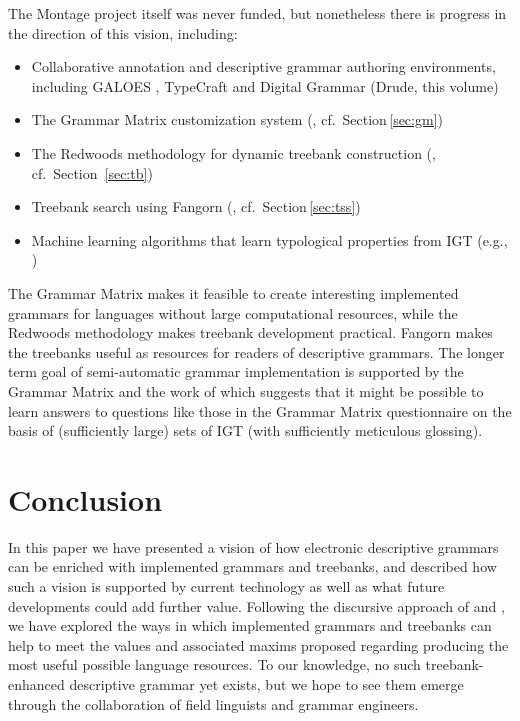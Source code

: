 \documentclass[12pt]{article}
\newcommand{\sref}[1]{Section$\,$\ref{#1}}
\begin{document}
The Montage project itself was never funded, but nonetheless there is progress
in the direction of this vision, including:

\begin{itemize}
\item Collaborative annotation and descriptive grammar authoring environments,
including GALOES \cite{Nordhoff:07}, TypeCraft \cite{Bee:Mih:09} and Digital Grammar \nocite{Drude:11} (Drude, this volume)
\item The Grammar Matrix customization system (, cf.\ \sref{sec:gm})
\item The Redwoods methodology for dynamic treebank construction (, cf.\ Section~\ref{sec:tb})
\item Treebank search using Fangorn (, cf.\ \sref{sec:tss})
\item Machine learning algorithms that learn typological properties
from IGT (e.g., )
\end{itemize}

The Grammar Matrix makes it feasible to create interesting implemented
grammars for languages without large computational resources, while the Redwoods methodology
makes treebank development practical. Fangorn makes the
treebanks useful as resources for readers of descriptive grammars.
The longer term goal of semi-automatic grammar implementation is
supported by the Grammar Matrix and the work of 
which suggests that it might be possible to learn answers to questions
like those in the Grammar Matrix questionnaire on the basis of
(sufficiently large) sets of IGT (with sufficiently meticulous
glossing).

\section{Conclusion}

In this paper we have presented a vision of how electronic descriptive
grammars can be enriched with implemented grammars and treebanks, and
described how such a vision is supported by current technology as well
as what future developments could add further value.  Following the
discursive approach of  and
, we have explored the ways in which implemented
grammars and treebanks can help to meet the values and associated
maxims proposed regarding producing the most useful possible language
resources.  To our knowledge, no such treebank-enhanced descriptive
grammar yet exists, but we hope to see them emerge through the
collaboration of field linguists and grammar engineers.





\end{document}
